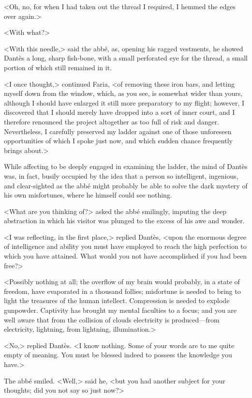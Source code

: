  <Oh, no, for when I had taken out the thread I required, I hemmed the edges over again.> 

 <With what?> 

 <With this needle,> said the abbé, as, opening his ragged vestments, he showed Dantès a long, sharp fish-bone, with a small perforated eye for the thread, a small portion of which still remained in it. 

 <I once thought,> continued Faria, <of removing these iron bars, and letting myself down from the window, which, as you see, is somewhat wider than yours, although I should have enlarged it still more preparatory to my flight; however, I discovered that I should merely have dropped into a sort of inner court, and I therefore renounced the project altogether as too full of risk and danger. Nevertheless, I carefully preserved my ladder against one of those unforeseen opportunities of which I spoke just now, and which sudden chance frequently brings about.> 

 While affecting to be deeply engaged in examining the ladder, the mind of Dantès was, in fact, busily occupied by the idea that a person so intelligent, ingenious, and clear-sighted as the abbé might probably be able to solve the dark mystery of his own misfortunes, where he himself could see nothing. 

 <What are you thinking of?> asked the abbé smilingly, imputing the deep abstraction in which his visitor was plunged to the excess of his awe and wonder. 

 <I was reflecting, in the first place,> replied Dantès, <upon the enormous degree of intelligence and ability you must have employed to reach the high perfection to which you have attained. What would you not have accomplished if you had been free?> 

 <Possibly nothing at all; the overflow of my brain would probably, in a state of freedom, have evaporated in a thousand follies; misfortune is needed to bring to light the treasures of the human intellect. Compression is needed to explode gunpowder. Captivity has brought my mental faculties to a focus; and you are well aware that from the collision of clouds electricity is produced—from electricity, lightning, from lightning, illumination.> 

 <No,> replied Dantès. <I know nothing. Some of your words are to me quite empty of meaning. You must be blessed indeed to possess the knowledge you have.> 

 The abbé smiled. <Well,> said he, <but you had another subject for your thoughts; did you not say so just now?> 

